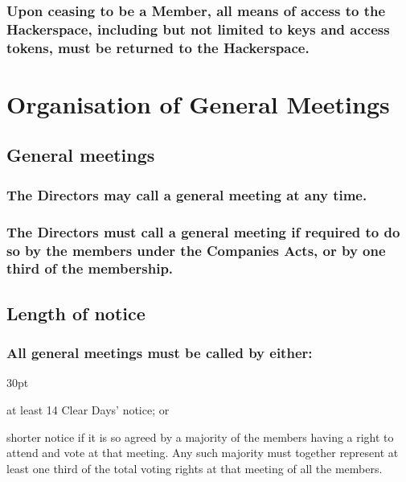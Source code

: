 \documentclass[12pt]{article}
\def\clauseindent{30pt}
\newenvironment{subindentpara}{\begin{adjustwidth}{\clauseindent}{}\begin{hanginglist}}{\end{hanginglist}\end{adjustwidth}}
\begin{document}
\subsubsection[Return of keys upon membership termination]{Upon ceasing to be a Member, all means of access to the Hackerspace, including but not limited to keys and access tokens, must be returned to the Hackerspace.}

\section*{Organisation of General Meetings}

\subsection{General meetings}
\subsubsection[Directors may call a general meeting]{The Directors may call a general meeting at any time.}
\subsubsection[Directors may be compelled to call general meeting]{The Directors must call a general meeting if required to do so by the members under the Companies Acts, or by one third of the membership.}

\subsection[Length of notice of general meetings]{Length of notice}
\subsubsection[Specifics of length of notice of general meetings]{All general meetings must be called by either:}
\begin{subindentpara}
    \item at least 14 Clear Days' notice; or
    \item shorter notice if it is so agreed by a majority of the members having a right to attend and vote at that meeting. Any such majority must together represent at least one third of the total voting rights at that meeting of all the members.
\end{subindentpara}
\end{document}
